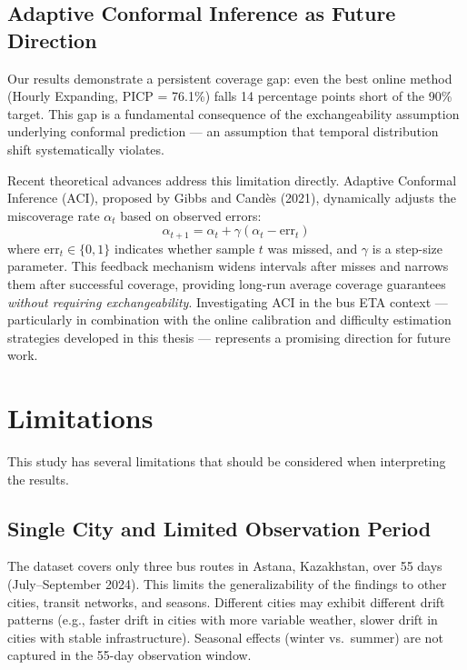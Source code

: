 \subsection{Adaptive Conformal Inference as Future Direction}

Our results demonstrate a persistent coverage gap: even the best online method (Hourly Expanding, PICP = 76.1\%) falls 14 percentage points short of the 90\% target. This gap is a fundamental consequence of the exchangeability assumption underlying conformal prediction — an assumption that temporal distribution shift systematically violates.

Recent theoretical advances address this limitation directly. Adaptive Conformal Inference (ACI), proposed by Gibbs and Cand\`{e}s (2021), dynamically adjusts the miscoverage rate $\alpha_t$ based on observed errors:
\[
\alpha_{t+1} = \alpha_t + \gamma(\alpha_t - \text{err}_t)
\]
where $\text{err}_t \in \{0, 1\}$ indicates whether sample $t$ was missed, and $\gamma$ is a step-size parameter. This feedback mechanism widens intervals after misses and narrows them after successful coverage, providing long-run average coverage guarantees \emph{without requiring exchangeability}. Investigating ACI in the bus ETA context — particularly in combination with the online calibration and difficulty estimation strategies developed in this thesis — represents a promising direction for future work.


\section{Limitations}
\label{sec:limitations}

This study has several limitations that should be considered when interpreting the results.

\subsection{Single City and Limited Observation Period}

The dataset covers only three bus routes in Astana, Kazakhstan, over 55 days (July--September 2024). This limits the generalizability of the findings to other cities, transit networks, and seasons. Different cities may exhibit different drift patterns (e.g., faster drift in cities with more variable weather, slower drift in cities with stable infrastructure). Seasonal effects (winter vs.\ summer) are not captured in the 55-day observation window.

